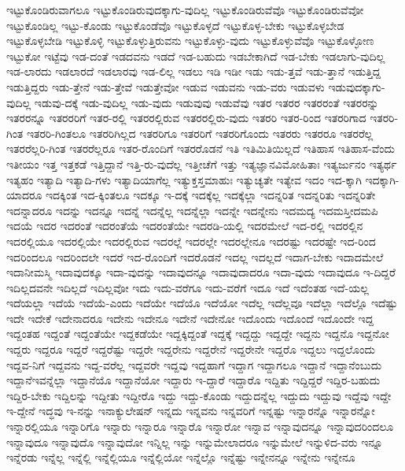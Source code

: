 {ಇಟ್ಟುಕೊಂಡಿರುವಾಗಲೂ
ಇಟ್ಟುಕೊಂಡಿರುವುದಕ್ಕಾಗು-ವುದಿಲ್ಲ
ಇಟ್ಟುಕೊಂಡಿರುವೆವೊ
ಇಟ್ಟುಕೊಂಡಿರುವೆವೋ
ಇಟ್ಟುಕೊಂಡಿಲ್ಲ
ಇಟ್ಟು-ಕೊಂಡು
ಇಟ್ಟುಕೊಂಡೆವೊ
ಇಟ್ಟುಕೊಳ್ಳದೆ
ಇಟ್ಟುಕೊಳ್ಳ-ಬೇಕು
ಇಟ್ಟುಕೊಳ್ಳಬೇಡ
ಇಟ್ಟುಕೊಳ್ಳಬೇಡಿ
ಇಟ್ಟುಕೊಳ್ಳಿ
ಇಟ್ಟುಕೊಳ್ಳುತ್ತಿರುವನು
ಇಟ್ಟುಕೊಳ್ಳು-ವುದು
ಇಟ್ಟುಕೊಳ್ಳುವೆವೊ
ಇಟ್ಟುಕೊಳ್ಳೋಣ
ಇಟ್ಟುಕೋ
ಇಟ್ಟೆವು
ಇಡ-ದಂತೆ
ಇಡದವನು
ಇಡದೆ
ಇಡ-ಬಹುದು
ಇಡಬೇಕಾಗಿದೆ
ಇಡ-ಬೇಕು
ಇಡಲಾಗು-ವುದಿಲ್ಲ
ಇಡ-ಲಾರದು
ಇಡಲಾರದೆ
ಇಡಲಾರವು
ಇಡ-ಲಿಲ್ಲ
ಇಡಲು
ಇಡಿ
ಇಡೀ
ಇಡು
ಇಡು-ತ್ತವೆ
ಇಡು-ತ್ತಾನೆ
ಇಡುತ್ತಿದ್ದ
ಇಡುತ್ತಿದ್ದರು
ಇಡು-ತ್ತೇನೆ
ಇಡು-ತ್ತೇವೆ
ಇಡುತ್ತೇವೋ
ಇಡುವ
ಇಡುವನು
ಇಡು-ವರು
ಇಡುವಳು
ಇಡುವುದಕ್ಕಾಗು-ವುದಿಲ್ಲ
ಇಡುವು-ದಕ್ಕೆ
ಇಡು-ವುದಿಲ್ಲ
ಇಡು-ವುದು
ಇಡುವುವು
ಇಡುವೆವು
ಇತರ
ಇತರರ
ಇತರರಂತೆ
ಇತರರನ್ನು
ಇತರರನ್ನೂ
ಇತರರರಿಗೆ
ಇತರ-ರಲ್ಲಿ
ಇತರರಲ್ಲಿರುವ
ಇತರರಲ್ಲಿರು-ವುದು
ಇತರರಿ
ಇತರ-ರಿಂದ
ಇತರರಿಗಾದ
ಇತರರಿ-ಗಿಂತ
ಇತರರಿ-ಗಿಂತಲೂ
ಇತರರಿಗಿಲ್ಲದ
ಇತರರಿಗೂ
ಇತರರಿಗೆ
ಇತರರಿಗೊಂದು
ಇತರರು
ಇತರರೂ
ಇತರರೆಲ್ಲ
ಇತರರೆಲ್ಲರಿ-ಗಿಂತ
ಇತರರೆಲ್ಲರೂ
ಇತರ-ರೊಂದಿಗೆ
ಇತರರೊಡನೆ
ಇತಿ
ಇತಿಮಿತಿಯಿಲ್ಲದೆ
ಇತಿಹಾಸ
ಇತಿಹಾಸ-ವೆಂದು
ಇತೀಯಂ
ಇತ್ತ
ಇತ್ತಕಡೆ
ಇತ್ತಿದ್ದಾನೆ
ಇತ್ತಿ-ರು-ವುದೆಲ್ಲ
ಇತ್ತೀಚೆಗೆ
ಇತ್ತು
ಇತ್ಯಜ್ಞಾನವಿಮೋಹಿತಾಃ
ಇತ್ಯರ್ಜುನಂ
ಇತ್ಯರ್ಥ
ಇತ್ಯಹಂ
ಇತ್ಯಾದಿ
ಇತ್ಯಾದಿ-ಗಳು
ಇತ್ಯಾದಿಯಾಗೆಲ್ಲ
ಇತ್ಯುಕ್ತಸ್ತಮಾಹುಃ
ಇತ್ಯುಚ್ಯತೇ
ಇತ್ಯೇವ
ಇದಂ
ಇದ-ಕ್ಕಾಗಿ
ಇದಕ್ಕಾಗಿ-ಯಾದರೂ
ಇದಕ್ಕಿಂತ
ಇದ-ಕ್ಕಿಂತಲೂ
ಇದಕ್ಕೂ
ಇ-ದಕ್ಕೆ
ಇದಕ್ಕೆಲ್ಲ
ಇದಕ್ಕೆಲ್ಲಾ
ಇದನ್ನರಿತ
ಇದನ್ನರಿತು
ಇದನ್ನರಿತೇ
ಇದನ್ನಾದರೂ
ಇದನ್ನು
ಇದನ್ನೂ
ಇದನ್ನೆ
ಇದನ್ನೆಲ್ಲ
ಇದನ್ನೆಲ್ಲಾ
ಇದನ್ನೇ
ಇದನ್ನೇನು
ಇದಮದ್ಯ
ಇದಮಸ್ತೀದಮಪಿ
ಇದಯೆ
ಇದರ
ಇದರಂತೆ
ಇದರಂತೆಯೆ
ಇದರಂತೆಯೇ
ಇದರಡಿ-ಯಲ್ಲಿ
ಇದರಮೇಲೆ
ಇದ-ರಲ್ಲಿ
ಇದರಲ್ಲಿನ
ಇದರಲ್ಲಿಯೂ
ಇದರಲ್ಲಿಯೇ
ಇದರಲ್ಲಿರುವ
ಇದರಲ್ಲೆ
ಇದರಲ್ಲೇ
ಇದರಲ್ಲೇನೂ
ಇದರಷ್ಟು
ಇದರಷ್ಟೇ
ಇದ-ರಿಂದ
ಇದರಿಂದಲೂ
ಇದರಿಂದಲೇ
ಇದರೆ
ಇದ-ರೊಂದಿಗೆ
ಇದರೊಡನೆ
ಇದಲ್ಲ
ಇದಲ್ಲದೆ
ಇದಾಗ-ಬೇಕು
ಇದಾದಮೇಲೆ
ಇದಾನೀಮಸ್ಮಿ
ಇದಾವುದಕ್ಕೂ
ಇದಾ-ವುದನ್ನು
ಇದಾವುದನ್ನೂ
ಇದಾವುದಾದರೂ
ಇದಾ-ವುದು
ಇದಾವುದೂ
ಇ-ದಿದ್ದರೆ
ಇದಿಲ್ಲದವನೇ
ಇದಿಲ್ಲದೆ
ಇದಿಲ್ಲವೋ
ಇದು
ಇದು-ವರೆಗೂ
ಇದು-ವರೆಗೆ
ಇದೂ
ಇದೆ
ಇದೆಂತಹ
ಇದೆ-ಯಲ್ಲ
ಇದೆಯಲ್ಲಾ
ಇದೆಯೆ
ಇದೆಯೆ-ಎಂದು
ಇದೆಯೇ
ಇದೆಯೊ
ಇದೆಯೋ
ಇದೆಲ್ಲ
ಇದೆಲ್ಲವೂ
ಇದೆಲ್ಲಾ
ಇದೆಲ್ಲೊ
ಇದೆಷ್ಟು
ಇದೇ
ಇದೇಕೆ
ಇದೇನಾದರೂ
ಇದೇನು
ಇದೇನೂ
ಇದೇನೆ
ಇದೇನೋ
ಇದೊಂದು
ಇದೊಂದೆ
ಇದೊಂದೇ
ಇದ್ದ
ಇದ್ದಂತಹ
ಇದ್ದಂತೆ
ಇದ್ದಂತೆಯೇ
ಇದ್ದಕಡೆಯೇ
ಇದ್ದಕ್ಕಿದ್ದಂತೆ
ಇದ್ದಕ್ಕೆ
ಇದ್ದದ್ದು
ಇದ್ದದ್ದೇ
ಇದ್ದನು
ಇದ್ದನೊ
ಇದ್ದನೋ
ಇದ್ದರು
ಇದ್ದರೂ
ಇದ್ದರೆ
ಇದ್ದರೆಷ್ಟು
ಇದ್ದರೇ
ಇದ್ದರೇನು
ಇದ್ದರೇನೆ
ಇದ್ದರೇನೇ
ಇದ್ದರೊ
ಇದ್ದಲು
ಇದ್ದಲೊಂದು
ಇದ್ದವ-ನಿಗೆ
ಇದ್ದವನು
ಇದ್ದ-ವರೆಲ್ಲ
ಇದ್ದವರೇ
ಇದ್ದವು
ಇದ್ದಹಾಗೆ
ಇದ್ದಾಗ
ಇದ್ದಾಗಲೂ
ಇದ್ದಾನೆ
ಇದ್ದಾನೆಂಬುದು
ಇದ್ದಾನೆಇವನ್ನೆಲ್ಲಾ
ಇದ್ದಾನೆಯೊ
ಇದ್ದಾನೆಯೋ
ಇದ್ದಾರು
ಇ-ದ್ದಾರೆ
ಇದ್ದಾರೊ
ಇದ್ದಿತು
ಇದ್ದಿದ್ದರೆ
ಇದ್ದಿರ-ಬಹುದು
ಇದ್ದಿರ-ಬೇಕು
ಇದ್ದಿಲನ್ನು
ಇದ್ದೀತು
ಇದ್ದೀರೊ
ಇದ್ದು
ಇದ್ದು-ಕೊಂಡು
ಇದ್ದುದನ್ನೆಲ್ಲ
ಇದ್ದುದು
ಇದ್ದುವು
ಇದ್ದೆವು
ಇದ್ದೇ
ಇ-ದ್ದೇನೆ
ಇದ್ಧವು
ಇ-ನನ್ನು
ಇನಾಕ್ಯುಲೇಷನ್
ಇನ್ನದು
ಇನ್ನವನು
ಇನ್ನವರಿಗೆ
ಇನ್ನಷ್ಟು
ಇನ್ನಾರನ್ನೊ
ಇನ್ನಾರನ್ನೋ
ಇನ್ನಾರಲ್ಲಿಯೂ
ಇನ್ನಾರಿಗೊ
ಇನ್ನಾರು
ಇನ್ನಾರೂ
ಇನ್ನಾರೊ
ಇನ್ನಾರೋ
ಇನ್ನಾವ
ಇನ್ನಾವುದನ್ನೂ
ಇನ್ನಾವುದರಿಂದಲೂ
ಇನ್ನಾವುದೂ
ಇನ್ನಾವುದೊ
ಇನ್ನಾವುದೋ
ಇನ್ನಿಲ್ಲ
ಇನ್ನು
ಇನ್ನುಮೇಲಾದರೂ
ಇನ್ನುಮೇಲೆ
ಇನ್ನುಳಿದ-ವರು
ಇನ್ನೂ
ಇನ್ನೆರಡು
ಇನ್ನೆಲ್ಲ
ಇನ್ನೆಲ್ಲಿ
ಇನ್ನೆಲ್ಲಿಯೂ
ಇನ್ನೆಲ್ಲಿಯೋ
ಇನ್ನೆಲ್ಲೊ
ಇನ್ನೆಷ್ಟು
ಇನ್ನೇನನ್ನೂ
ಇನ್ನೇನು
ಇನ್ನೇನೂ
}
